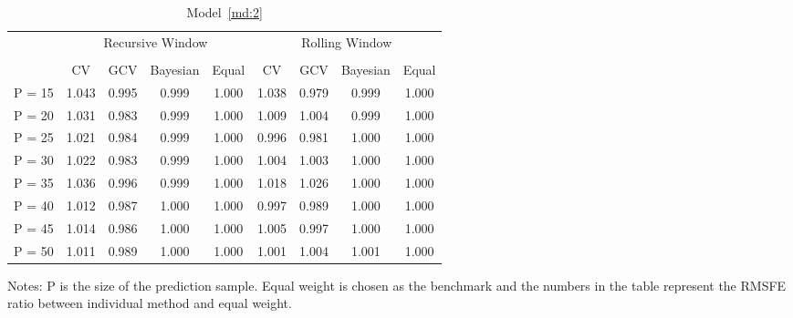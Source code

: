 \begin{table}
\caption{Model~\ref{md:2}} \label{tb:9}
\centering
\begin{adjustbox}{keepaspectratio}
\begin{threeparttable}
\begin{tabular}{lcccccccc}
\toprule
 & \multicolumn{4}{c}{Recursive Window} & \multicolumn{4}{c}{Rolling Window}\\%
\cmidrule(r){2-5}
\cmidrule(r){6-9}\\
       & CV & GCV & Bayesian & Equal & CV & GCV & Bayesian & Equal \\
P = 15 &1.043 &0.995 &0.999 & 1.000& 1.038& 0.979& 0.999& 1.000\\
P = 20 &1.031 &0.983 &0.999 & 1.000& 1.009& 1.004& 0.999& 1.000\\
P = 25 &1.021 &0.984 &0.999 & 1.000& 0.996& 0.981& 1.000& 1.000\\
P = 30 &1.022 &0.983 &0.999 & 1.000& 1.004& 1.003& 1.000& 1.000\\
P = 35 &1.036 &0.996 &0.999 & 1.000& 1.018& 1.026& 1.000& 1.000\\
P = 40 &1.012 &0.987 &1.000 & 1.000& 0.997& 0.989& 1.000& 1.000\\
P = 45 &1.014 &0.986 &1.000 & 1.000& 1.005& 0.997& 1.000& 1.000\\
P = 50 &1.011 &0.989 &1.000 & 1.000& 1.001& 1.004& 1.001& 1.000\\
\bottomrule
\end{tabular}
\begin{tablenotes} \footnotesize
Notes: $\mathrm{P}$ is the size of the prediction sample. Equal weight is chosen as the benchmark and the numbers in the table represent the RMSFE ratio between individual method and equal weight.
\end{tablenotes}
\end{threeparttable}
\end{adjustbox}
\end{table} 